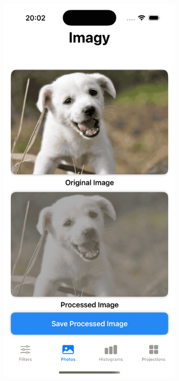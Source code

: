 \documentclass[a4paper]{article}
\begin{document}
\begin{figure}[H]
    \centering
    \begin{subfigure}{0.2\textwidth}
        \centering
        \includegraphics[width=\linewidth]{images/dog_contrast_0.4.png}

\end{subfigure}
\end{figure}
\end{document}
